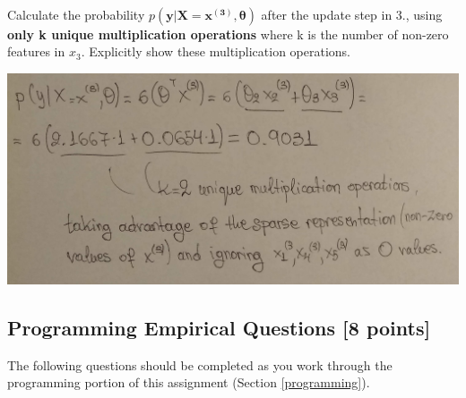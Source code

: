 \documentclass[11pt]{article}
\numberwithin{equation}{section} %
\numberwithin{figure}{section} %
\numberwithin{table}{section} %
\def\y{\mathbf y}
\newcommand{\thetav     }{\boldsymbol \theta     }
\begin{document}
\begin{enumerate}
\begin{table}[h]
\begin{tabular}{cll}
    \bottomrule
    \end{tabular}
    \end{table}\\
    Calculate the probability $p\left(\y|\mathbf{X=x^{(3)}},\thetav\right)$ after the update step in 3., using \textbf{only k unique multiplication operations} where k is the number of non-zero features in $x_3$. Explicitly show these multiplication operations.
    \begin{solution}
    \includegraphics[scale=0.14]{pic8}
    \end{solution}
    

 \end{enumerate}
 \clearpage
\subsection{Programming Empirical Questions [8 points]}
\label{sec:empirical}

The following questions should be completed as you work through the programming portion of this assignment (Section \ref{programming}).
\end{document}
